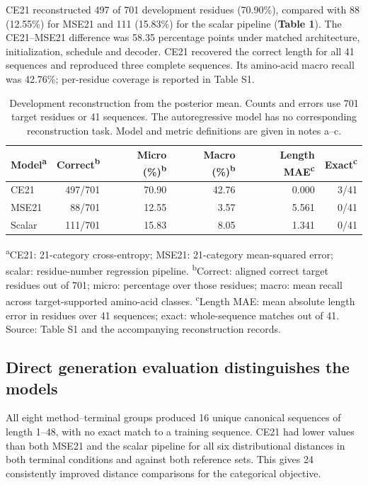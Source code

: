 \documentclass[unnumsec,webpdf,contemporary,large]{oup-authoring-template}
\begin{document}
CE21 reconstructed 497 of 701 development residues (70.90\%), compared with 88 (12.55\%) for MSE21 and 111 (15.83\%) for the scalar pipeline (\textbf{Table 1}). The CE21--MSE21 difference was 58.35 percentage points under matched architecture, initialization, schedule and decoder. CE21 recovered the correct length for all 41 sequences and reproduced three complete sequences. Its amino-acid macro recall was 42.76\%; per-residue coverage is reported in Table S1.

\begin{table}[t]
\caption{Development reconstruction from the posterior mean. Counts and errors use 701 target residues or 41 sequences. The autoregressive model has no corresponding reconstruction task. Model and metric definitions are given in notes a--c.}
\label{tab:reconstruction}
\centering
\begin{tabular}{lrrrrr}
\toprule
Model\textsuperscript{a} & Correct\textsuperscript{b} & Micro (\%)\textsuperscript{b} & Macro (\%)\textsuperscript{b} & Length MAE\textsuperscript{c} & Exact\textsuperscript{c} \\
\midrule
CE21 & 497/701 & 70.90 & 42.76 & 0.000 & 3/41 \\
MSE21 & 88/701 & 12.55 & 3.57 & 5.561 & 0/41 \\
Scalar & 111/701 & 15.83 & 8.05 & 1.341 & 0/41 \\
\bottomrule
\end{tabular}
\par\smallskip
\begin{minipage}{0.96\textwidth}\footnotesize
\textsuperscript{a}CE21: 21-category cross-entropy; MSE21: 21-category mean-squared error; scalar: residue-number regression pipeline.
\textsuperscript{b}Correct: aligned correct target residues out of 701; micro: percentage over those residues; macro: mean recall across target-supported amino-acid classes.
\textsuperscript{c}Length MAE: mean absolute length error in residues over 41 sequences; exact: whole-sequence matches out of 41. Source: Table S1 and the accompanying reconstruction records.
\end{minipage}
\end{table}

\subsection{Direct generation evaluation distinguishes the models}

All eight method--terminal groups produced 16 unique canonical sequences of length 1--48, with no exact match to a training sequence. CE21 had lower values than both MSE21 and the scalar pipeline for all six distributional distances in both terminal conditions and against both reference sets. This gives 24 consistently improved distance comparisons for the categorical objective.
\end{document}
